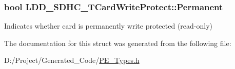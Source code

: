 \subsubsection[{Permanent}]{\setlength{\rightskip}{0pt plus 5cm}bool L\+D\+D\+\_\+\+S\+D\+H\+C\+\_\+\+T\+Card\+Write\+Protect\+::\+Permanent}\label{struct_l_d_d___s_d_h_c___t_card_write_protect_aff6b0178087c770234bd68974d643552}
Indicates whether card is permanently write protected (read-\/only) 

The documentation for this struct was generated from the following file\+:\begin{DoxyCompactItemize}
\item 
D\+:/\+Project/\+Generated\+\_\+\+Code/\hyperlink{_p_e___types_8h}{P\+E\+\_\+\+Types.\+h}\end{DoxyCompactItemize}
